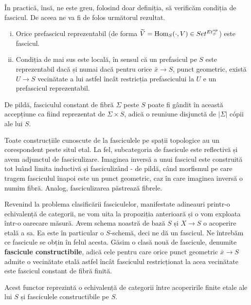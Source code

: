 \documentclass[13pt,openany]{book}
\begin{document}
În practică, însă, ne este greu, folosind doar definiția, să verificăm condiția de fascicul. De aceea ne va fi de folos următorul rezultat.

\begin{prop}
\begin{enumerate}[i)]
\item Orice prefascicul reprezentabil (de forma $\widetilde{V} = \text{{\normalfont Hom}}_S(\cdot,V) \in Set^{Et_S^{op}}$) este fascicul.
\item Condiția de mai sus este locală, în sensul că un prefasicul pe $S$ este reprezentabil dacă și numai dacă pentru orice $\bar{x} \rightarrow S$, punct geometric, există $U \rightarrow S$ vecinătate a lui astfel încât restricția prefascicului la $U$ e un prefascicul reprezentabil.
\end{enumerate}
\end{prop}

De pildă, fasciculul constant de fibră $\Sigma$ peste $S$ poate fi gândit în această accepțiune ca fiind reprezentat de $\Sigma \times S$, adică o reuniune disjunctă de $|\Sigma|$ cópii ale lui $S$.

Toate construcțiile cunoscute de la fasciculele pe spații topologice au un corespondent peste situl etal. La fel, subcategoria de fascicule este reflectivă și avem adjunctul de fasciculizare. Imaginea inversă a unui fascicul este construită tot luând limita inductivă și fasciculizând - de pildă, când morfismul pe care tragem fasciculul înapoi este un punct geometric, caz în care imaginea inversă o numim fibră. Analog, fasciculizarea păstrează fibrele.

Revenind la problema clasificării fasciculelor, manifestate adineauri printr-o echivalență de categorii, ne vom uita la propoziția anterioară și o vom exploata într-o oarecare măsură. Avem schema noastră de bază $S$ și $X \rightarrow S$ o acoperire etală a sa. Ea este în particular o $S$-schemă, deci ne dă un fascicul. Ne întrebăm ce fascicule se obțin în felul acesta. Găsim o clasă nouă de fascicule, denumite {\bf fascicule constructibile}, adică cele pentru care orice punct geometric $\bar{x} \rightarrow S$ admite o vecinătate etală astfel încât fasciculul restricționat la acea vecinătate este fascicul constant de fibră finită.

\begin{teo}
Acest functor reprezintă o echivalență de categorii între acoperirile finite etale ale lui $S$ și fasciculele constructibile pe $S$.
\end{teo}
\end{document}
